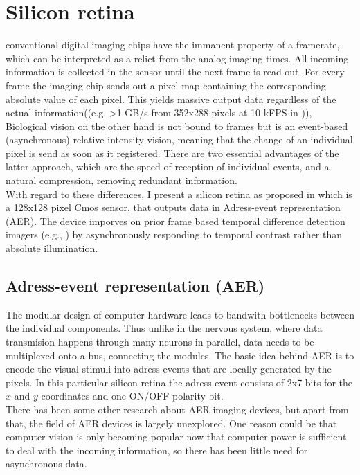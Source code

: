 \documentclass{SeminarV2}
\begin{document}
\section{Silicon retina}
conventional digital imaging chips have the immanent property of a framerate, which can be interpreted as a relict from the analog imaging times. All incoming information is collected in the sensor until the next frame is read out. For every frame the imaging chip sends out a pixel map containing the corresponding absolute value of each pixel. This yields massive output data regardless of the actual information((e.g. >1 GB/s from 352x288 pixels at 10 kFPS in \cite{kleinfelder_10000_2001})),   Biological vision on the other hand is not bound to frames but is an event-based (asynchronous) relative intensity vision, meaning that the change of an individual pixel is send as soon as it registered. There are two essential advantages of the latter approach, which are the speed of reception of individual events, and a natural compression, removing redundant information.\\
With regard to these differences, I present a silicon retina as proposed in \cite{lichtsteiner_128_2008} which is a 128x128 pixel Cmos sensor, that outputs data in Adress-event representation (AER). The device imporves on prior frame based temporal
difference detection imagers (e.g., \cite{mallik_temporal_2005}) by asynchronously responding to temporal contrast rather than absolute illumination.

\subsection{Adress-event representation (AER)}
The modular design of computer hardware leads to bandwith bottlenecks between the individual components. Thus unlike in the nervous system, where data transmision happens through many neurons in parallel, data needs to be multiplexed onto a bus, connecting the modules. The basic idea behind AER is to encode the visual stimuli into adress events that are locally generated by the pixels. In this particular silicon retina the adress event consists of 2x7 bits for the $x$ and $y$ coordinates and one ON/OFF polarity bit.\\
There has been some other research about AER imaging devices, but apart from that, the field of AER devices is largely unexplored.
One reason could be that computer vision is only becoming popular now that computer power is sufficient to deal with the incoming information, so there has been little need for asynchronous data.
\end{document}
